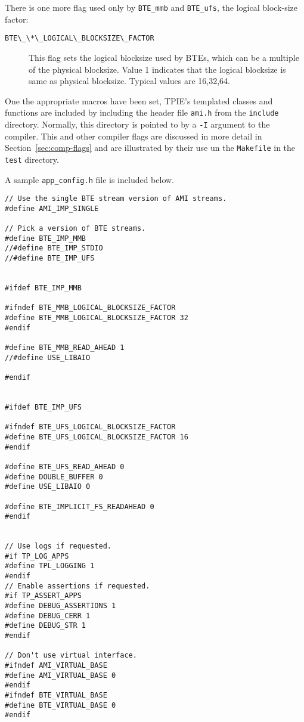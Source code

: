 There is one more flag used only by \verb|BTE_mmb| and \verb|BTE_ufs|, the
logical block-size factor:
\begin{description}
  
\item[{\verb|BTE\_\*\_LOGICAL\_BLOCKSIZE\_FACTOR|}] This flag sets the logical
  blocksize used by BTEs, which can be a multiple of the physical
  blocksize. Value 1 indicates that the logical blocksize is same as
  physical blocksize. Typical values are 16,32,64.
\end{description}


One the appropriate macros have been set, TPIE's templated classes and
functions are included by including the header file {\tt ami.h} from
the {\tt include} directory.  Normally, this directory is pointed to
by a {\tt -I} argument to the compiler.  This and other compiler flags
are discussed in more detail in Section~\ref{sec:comp-flags} and are
illustrated by their use un the {\tt Makefile} in the
{\tt test} directory.


A sample \verb|app_config.h| file is included below.

\begin{verbatim}
// Use the single BTE stream version of AMI streams.
#define AMI_IMP_SINGLE

// Pick a version of BTE streams.
#define BTE_IMP_MMB
//#define BTE_IMP_STDIO
//#define BTE_IMP_UFS


#ifdef BTE_IMP_MMB

#ifndef BTE_MMB_LOGICAL_BLOCKSIZE_FACTOR
#define BTE_MMB_LOGICAL_BLOCKSIZE_FACTOR 32
#endif

#define BTE_MMB_READ_AHEAD 1
//#define USE_LIBAIO

#endif 


#ifdef BTE_IMP_UFS

#ifndef BTE_UFS_LOGICAL_BLOCKSIZE_FACTOR
#define BTE_UFS_LOGICAL_BLOCKSIZE_FACTOR 16
#endif

#define BTE_UFS_READ_AHEAD 0
#define DOUBLE_BUFFER 0
#define USE_LIBAIO 0

#define BTE_IMPLICIT_FS_READAHEAD 0
#endif


// Use logs if requested.
#if TP_LOG_APPS
#define TPL_LOGGING 1
#endif
// Enable assertions if requested.
#if TP_ASSERT_APPS
#define DEBUG_ASSERTIONS 1
#define DEBUG_CERR 1
#define DEBUG_STR 1
#endif

// Don't use virtual interface.
#ifndef AMI_VIRTUAL_BASE
#define AMI_VIRTUAL_BASE 0
#endif
#ifndef BTE_VIRTUAL_BASE 
#define BTE_VIRTUAL_BASE 0
#endif

\end{verbatim}

